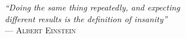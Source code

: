 {\sffamily\itshape
``Doing the same thing repeatedly, and expecting \\
different results is the definition of insanity''\\}
--- \textsc{Albert Einstein}
